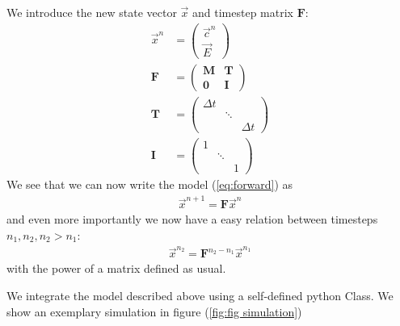 \documentclass[]{article}
\begin{document}
We introduce the new state vector $\vec{x}$ and timestep matrix $\mathbf{F}$:
\begin{align}
\vec{x}^n &= 
\begin{pmatrix}
\vec{c}^n \label{eq: x vector}\\
\vec{E}
\end{pmatrix} \\
\mathbf{F} &=
\begin{pmatrix}
\mathbf{M} & \mathbf{T} \\
\mathbf{0} & \mathbf{I}
\end{pmatrix} \\
\mathbf{T} &= 
\begin{pmatrix}
\Delta t & & \\
& \ddots & \\
& & \Delta t
\end{pmatrix} \\
\mathbf{I} &=
\begin{pmatrix}
1 & & \\
& \ddots & \\
& & 1
\end{pmatrix}
\end{align}
We see that we can now write the model (\ref{eq:forward}) as 
\begin{align}
\vec{x}^{n+1} = \mathbf{F} \vec{x}^n
\end{align}
and even more importantly we now have a easy relation between timesteps $n_1, n_2, n_2 > n_1$:
\begin{align}
\vec{x}^{n_2} = \mathbf{F}^{n_2 - n_1} \vec{x}^{n_1}
\end{align}
with the power of a matrix defined as usual.


We integrate the model described above using a self-defined python Class. We show an exemplary simulation in figure (\ref{fig:fig simulation})

%		
\end{document}
